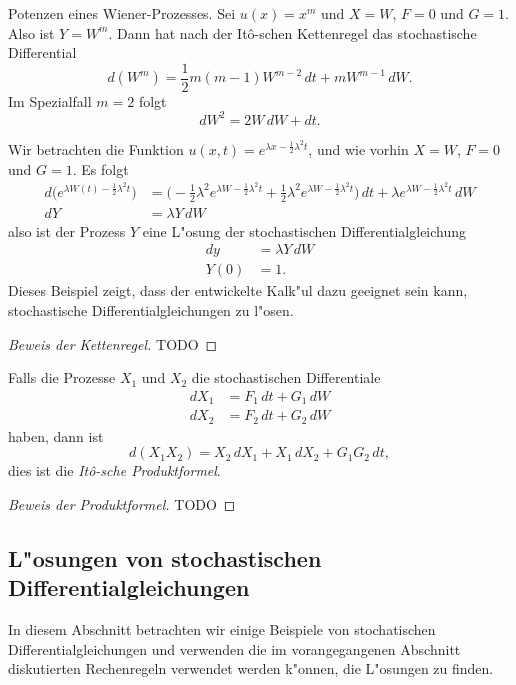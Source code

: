 \begin{beispiel}
Potenzen eines Wiener-Prozesses.
Sei $u(x)=x^m$ und $X=W$, $F=0$ und $G=1$.
Also ist $Y=W^m$.
Dann hat nach der It\^o-schen Kettenregel das stochastische Differential
\[
d(W^m)
=
\frac12m(m-1)W^{m-2}\,dt + mW^{m-1}\,dW.
\]
Im Spezialfall $m=2$ folgt
\[
dW^2 = 2W\,dW + dt.
\]
\end{beispiel}

\begin{beispiel} Wir betrachten die Funktion
$u(x,t)=e^{\lambda x-\frac12\lambda^2 t}$, und wie vorhin $X=W$, $F=0$
und $G=1$.
Es folgt
\begin{align*}
d\biggl(
e^{\lambda W(t)-\frac12\lambda^2 t}
\biggr)
&=
\biggl(
-\frac12\lambda^2 e^{\lambda W-\frac12\lambda^2 t}
+
\frac12\lambda^2 e^{\lambda W-\frac12\lambda^2 t}
\biggr)\,dt
+
\lambda e^{\lambda W -\frac12\lambda^2 t}\,dW
\\
dY&=\lambda Y\,dW
\end{align*}
also ist der Prozess $Y$ eine L"osung der stochastischen Differentialgleichung
\begin{align*}
dy&=\lambda Y\,dW
\\
Y(0)&=1.
\end{align*}
Dieses Beispiel zeigt, dass der entwickelte Kalk"ul dazu geeignet sein kann,
stochastische Differentialgleichungen zu l"osen.
\end{beispiel}

\begin{proof}[Beweis der Kettenregel]
TODO
\end{proof}

\begin{satz}
Falls die Prozesse $X_1$ und $X_2$ die stochastischen Differentiale
\begin{align*}
dX_1
&=
F_1\,dt + G_1\,dW
\\
dX_2
&=
F_2\,dt + G_2\,dW
\end{align*}
haben, dann ist
\[
d(X_1X_2)
=
X_2\,dX_1 + X_1\,dX_2 + G_1G_2\,dt,
\]
dies ist die {\em It\^o-sche Produktformel}.
\end{satz}

\begin{proof}[Beweis der Produktformel]
TODO
\end{proof}

%
%
\subsection{L"osungen von stochastischen Differentialgleichungen}
In diesem Abschnitt betrachten wir einige Beispiele von stochatischen
Differentialgleichungen und verwenden die im vorangegangenen Abschnitt
diskutierten Rechenregeln verwendet werden k"onnen, die L"osungen
zu finden.

